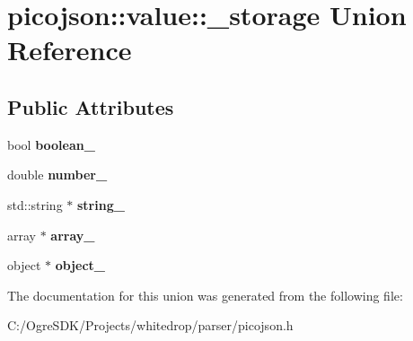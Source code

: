 \hypertarget{unionpicojson_1_1value_1_1__storage}{\section{picojson\+:\+:value\+:\+:\+\_\+storage Union Reference}
\label{unionpicojson_1_1value_1_1__storage}
}
\subsection*{Public Attributes}
\begin{DoxyCompactItemize}
\item 
\hypertarget{unionpicojson_1_1value_1_1__storage_a612a1a8ceb65bdd2e8f09eb33074ba0b}{bool {\bfseries boolean\+\_\+}}\label{unionpicojson_1_1value_1_1__storage_a612a1a8ceb65bdd2e8f09eb33074ba0b}

\item 
\hypertarget{unionpicojson_1_1value_1_1__storage_a4fc799f222c28156f943a891e510e438}{double {\bfseries number\+\_\+}}\label{unionpicojson_1_1value_1_1__storage_a4fc799f222c28156f943a891e510e438}

\item 
\hypertarget{unionpicojson_1_1value_1_1__storage_a9ec5aa5b86bbef81b15697c936f58736}{std\+::string $\ast$ {\bfseries string\+\_\+}}\label{unionpicojson_1_1value_1_1__storage_a9ec5aa5b86bbef81b15697c936f58736}

\item 
\hypertarget{unionpicojson_1_1value_1_1__storage_aeac6ef9328845f1f6402c35bb281990a}{array $\ast$ {\bfseries array\+\_\+}}\label{unionpicojson_1_1value_1_1__storage_aeac6ef9328845f1f6402c35bb281990a}

\item 
\hypertarget{unionpicojson_1_1value_1_1__storage_ad1feb283e78999609c7a27be95e5f4df}{object $\ast$ {\bfseries object\+\_\+}}\label{unionpicojson_1_1value_1_1__storage_ad1feb283e78999609c7a27be95e5f4df}

\end{DoxyCompactItemize}


The documentation for this union was generated from the following file\+:\begin{DoxyCompactItemize}
\item 
C\+:/\+Ogre\+S\+D\+K/\+Projects/whitedrop/parser/picojson.\+h\end{DoxyCompactItemize}
